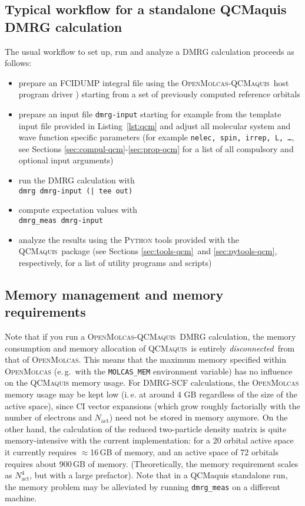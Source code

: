 \documentclass[bibliography=totoc,12pt,a4paper]{scrartcl}
\newcommand{\mol}{\textsc{OpenMolcas}}
\newcommand{\qcm}{\textsc{QCMaquis}}
\begin{document}
\subsection{Typical workflow for a standalone QCMaquis DMRG calculation}
\label{sec:workflow-qcm}

The usual workflow to set up, run and analyze a DMRG calculation proceeds as follows:

\begin{itemize}
   \item prepare an FCIDUMP integral file using the \mol-\qcm\ host
   program driver \cite{interface}) starting from a set of previously computed reference orbitals
   \item prepare an input file \texttt{dmrg-input} starting for example from the template input file provided in Listing~\ref{lst:qcm} and adjust all molecular system and wave function specific parameters (for example \texttt{nelec, spin,
   irrep, L, \ldots}, see Sections \ref{sec:compul-qcm}-\ref{sec:prop-qcm} for a list of all compulsory and optional input arguments)
   \item run the DMRG calculation with\\
\texttt{dmrg dmrg-input (| tee out)}
   \item compute expectation values with\\
\texttt{dmrg\_meas dmrg-input}
   \item analyze the results using the \textsc{Python} tools provided with the \qcm\ package (see Sections \ref{sec:tools-qcm}\ and
   \ref{sec:pytools-qcm}, respectively, for a list of utility programs and scripts)
\end{itemize}

\subsection{Memory management and memory requirements}\label{sec:memory-qcm}

Note that if you run a \mol-\qcm\ DMRG calculation, the memory consumption and memory allocation
of \qcm\ is entirely \emph{disconnected}\ from that of \mol. This means that the maximum memory specified within \mol{} (e.\,g.\ with the \texttt{MOLCAS\_MEM} environment variable) has no influence on the \qcm{} memory usage. For DMRG-SCF calculations, the \mol{} memory usage may be kept low (i.\,e. at around 4 GB regardless of the size of the active space), since CI vector expansions (which grow roughly factorially with the number of electrons and $N_\text{act}$) need not be stored in memory anymore. On the other hand, the calculation of the reduced two-particle density matrix is quite memory-intensive with the current implementation: for a 20 orbital active space it currently requires $\approx$16\,GB of memory, and an active space of 72 orbitals requires about 900\,GB of memory. (Theoretically, the memory requirement scales as $N_\text{act}^4$, but with a large prefactor). Note that in a QCMaquis standalone run, the memory problem may be alleviated by running \texttt{dmrg\_meas} on a different machine.
\end{document}
